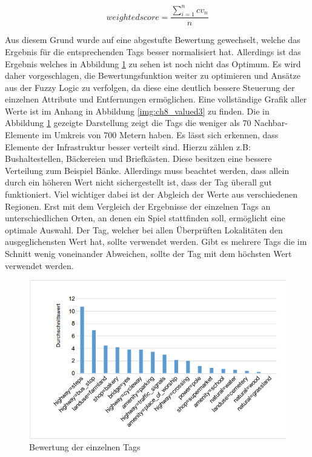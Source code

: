 \begin{equation}
weighted score = \frac{ \sum\limits_{i=1}^n cv_n }{n}
\end{equation}

Aus diesem Grund wurde auf eine abgestufte Bewertung gewechselt, welche das Ergebnis für die entsprechenden Tags besser normalisiert hat.
Allerdings ist das Ergebnis welches in Abbildung \ref{img:ch6_img07_result1} zu sehen ist noch nicht das Optimum. Es wird daher vorgeschlagen, die Bewertungsfunktion weiter zu optimieren und Ansätze aus der Fuzzy Logic zu verfolgen, da diese eine deutlich bessere Steuerung der einzelnen Attribute und Entfernungen ermöglichen. Eine vollständige Grafik aller Werte ist im Anhang in Abbildung \ref{img:ch8_valued3} zu finden. Die in Abbildung \ref{img:ch6_img07_result1} gezeigte Darstellung zeigt die Tags die weniger als 70 Nachbar-Elemente im Umkreis von 700 Metern haben.
Es lässt sich erkennen, dass Elemente der Infrastruktur besser verteilt sind. Hierzu zählen z.B: Bushaltestellen, Bäckereien und Briefkästen. Diese besitzen eine bessere Verteilung zum Beispiel Bänke. Allerdings muss beachtet werden, dass allein durch ein höheren Wert nicht sichergestellt ist, dass der Tag überall gut funktioniert. Viel wichtiger dabei ist der Abgleich der Werte aus verschiedenen Regionen. Erst mit dem Vergleich der Ergebnisse der einzelnen Tags an unterschiedlichen Orten, an denen ein Spiel stattfinden soll, ermöglicht eine optimale Auswahl.
Der Tag, welcher bei allen Überprüften Lokalitäten den ausgeglichensten Wert hat, sollte verwendet werden. Gibt es mehrere Tags die im Schnitt wenig voneinander Abweichen, sollte der Tag mit dem höchsten Wert verwendet werden. 

\begin{figure}[H]
\begin{center}
\includegraphics[width=150mm]{images/ch6_img07_result1.png}
\caption{Bewertung der einzelnen Tags}
\label{img:ch6_img07_result1}
\end{center}
\end{figure}
